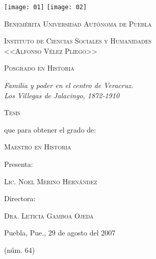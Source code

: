 \documentclass[14pt,twoside,final]{extbook} %
\begin{document}
\setcounter{page}{1}
\parindent=5mm %
\parskip=0mm %
\newpage
\pagestyle{empty}
\begin{center}
\begin{minipage}{11cm}
\texttt{[image: 01]}\label{fig:buap} \hfill \texttt{[image: 02]}
\label{fig:icsyh}
\end{minipage}
\end{center}
\smallskip
\begin{center}
\large\scshape Benemérita Universidad Autónoma de Puebla
\end{center}
\begin{center}
\large\scshape Instituto de Ciencias Sociales y Humanidades \\

<<Alfonso Vélez Pliego>> 
\end{center}
\begin{center}
\large\scshape Posgrado en Historia
\end{center}
\bigskip
\begin{center}
\Large\itshape Familia y poder en el centro de Veracruz. \\ Los Villegas de Jalacingo, 1872-1910
\end{center}
\bigskip
\begin{center}
\Large\scshape Tesis
\end{center}
\bigskip
\begin{center}
que para obtener el grado de:
\end{center}
\begin{center}
\scshape Maestro en Historia
\end{center}
\begin{center}
Presenta:
\end{center}
\begin{center}
\scshape Lic. Noel Merino Hernández
\end{center}
\begin{center}
Directora:
\end{center}
\begin{center}
\scshape Dra. Leticia Gamboa Ojeda
\end{center}
\medskip
\begin{center}
Puebla, Pue., 29 de agosto del 2007
\end{center}
\begin{center}
(núm. 64)
\end{center}
\end{document}
